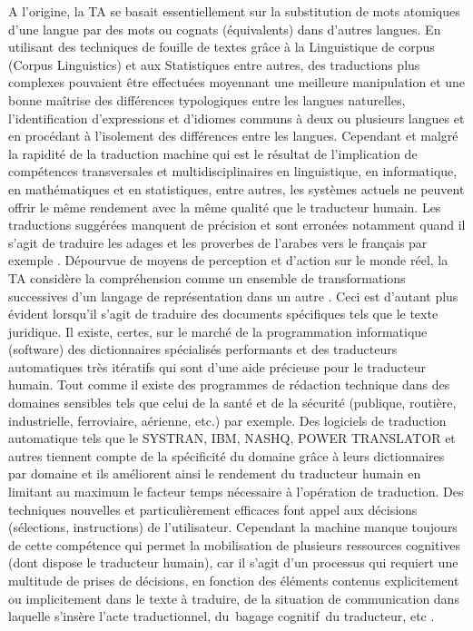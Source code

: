 \documentclass[french]{textolivre}
\begin{document}
A l’origine, la TA se basait essentiellement sur la substitution de mots atomiques d’une langue par des mots ou cognats (équivalents) dans d’autres langues. En utilisant des techniques de fouille de textes grâce à la Linguistique de corpus (Corpus Linguistics) et aux Statistiques entre autres, des traductions plus complexes pouvaient être effectuées moyennant une meilleure manipulation et une bonne maîtrise des différences typologiques entre les langues naturelles, l'identification d'expressions et d’idiomes communs à deux ou plusieurs langues et en procédant à l'isolement des différences entre les langues. Cependant et malgré la rapidité de la traduction machine qui est le résultat de l’implication de compétences transversales et multidisciplinaires en linguistique, en informatique, en mathématiques et en statistiques, entre autres, les systèmes actuels ne peuvent offrir le même rendement avec la même qualité que le traducteur humain. Les traductions suggérées manquent de précision et sont erronées notamment quand il s’agit de traduire les adages et les proverbes de l’arabes vers le français par exemple \cite{bedjaoui2020}. Dépourvue de moyens de perception et d’action sur le monde réel, la TA considère la compréhension comme un ensemble de transformations successives d’un langage de représentation dans un autre \cite{ke_hu2020}. Ceci est d’autant plus évident lorsqu’il s’agit de traduire des documents spécifiques tels que le texte juridique. Il existe, certes, sur le marché de la programmation informatique (software) des dictionnaires spécialisés performants et des traducteurs automatiques très itératifs qui sont d’une aide précieuse pour le traducteur humain. Tout comme il existe des programmes de rédaction technique dans des domaines sensibles tels que celui de la santé et de la sécurité (publique, routière, industrielle, ferroviaire, aérienne, etc.) par exemple. Des logiciels de traduction automatique tels que le SYSTRAN, IBM, NASHQ, POWER TRANSLATOR et autres tiennent compte de la spécificité du domaine grâce à leurs dictionnaires par domaine et ils améliorent ainsi le rendement du traducteur humain en limitant au maximum le facteur temps nécessaire à l’opération de traduction. Des techniques nouvelles et particulièrement efficaces font appel aux décisions (sélections, instructions) de l’utilisateur. Cependant la machine manque toujours de cette compétence qui permet la mobilisation de plusieurs ressources cognitives (dont dispose le traducteur humain), car il s’agit d’un processus qui requiert une multitude de prises de décisions, en fonction des éléments contenus explicitement ou implicitement dans le texte à traduire, de la situation de communication dans laquelle s’insère l’acte traductionnel, du bagage cognitif du traducteur, etc \cite{politis2017}.
\end{document}
